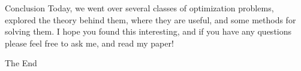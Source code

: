 \documentclass{beamer}
\begin{document}
%
%	
	\begin{frame}{Conclusion}
		Today, we went over several classes of optimization problems, explored the theory behind them, where they are useful, and some methods for solving them.
		I hope you found this interesting, and if you have any questions please feel free to ask me, and read my paper!
		\huge{\centerline{The End}}
	\end{frame}
	
\end{document}
